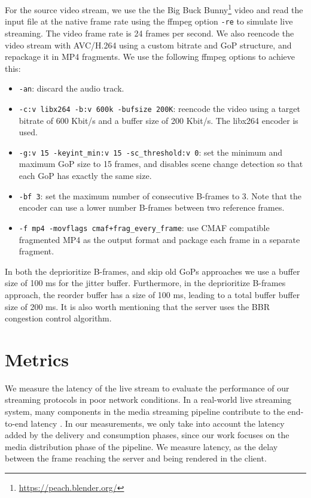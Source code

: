 For the source video stream, we use the the Big Buck Bunny\footnote{\url{https://peach.blender.org/}} video and read the input file at the native frame rate using the ffmpeg option \lstinline{-re} to simulate live streaming. The video frame rate is 24 frames per second. We also reencode the video stream with AVC/H.264 using a custom bitrate and GoP structure, and repackage it in MP4 fragments. We use the following ffmpeg options to achieve this:
\begin{itemize}
    \item \lstinline{-an}: discard the audio track.
    \item \lstinline{-c:v libx264 -b:v 600k -bufsize 200K}: reencode the video using a target bitrate of 600 Kbit/s and a buffer size of 200 Kbit/s. The libx264 encoder is used.
    \item \lstinline{-g:v 15 -keyint_min:v 15 -sc_threshold:v 0}: set the minimum and maximum GoP size to 15 frames, and disables scene change detection so that each GoP has exactly the same size. 
    \item \lstinline{-bf 3}: set the maximum number of consecutive B-frames to 3. Note that the encoder can use a lower number B-frames between two reference frames.
    \item \lstinline{-f mp4 -movflags cmaf+frag_every_frame}: use \ac{CMAF} compatible fragmented MP4 as the output format and package each frame in a separate fragment.
\end{itemize}

In both the deprioritize B-frames, and skip old \acp{GoP} approaches we use a buffer size of 100 ms for the jitter buffer. Furthermore, in the deprioritize B-frames approach, the reorder buffer has a size of 100 ms, leading to a total buffer buffer size of 200 ms. It is also worth mentioning that the server uses the BBR congestion control algorithm.

\section{Metrics}
We measure the latency of the live stream to evaluate the performance of our streaming protocols in poor network conditions. In a real-world live streaming system, many components in the media streaming pipeline contribute to the end-to-end latency \parencite{bentalebOneSecondLatencyEvolution2023}. In our measurements, we only take into account the latency added by the delivery and consumption phases, since our work focuses on the media distribution phase of the pipeline. We measure latency, as the delay between the frame reaching the server and being rendered in the client.  

